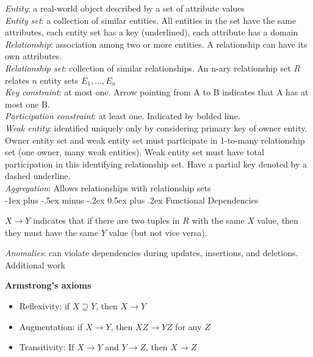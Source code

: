\documentclass[10pt,landscape]{article}
\makeatletter
\renewcommand{\section}{\@startsection{section}{1}{0mm}%
                                {-1ex plus -.5ex minus -.2ex}%
                                {0.5ex plus .2ex}%
                                {\normalfont\large\bfseries}}
\makeatother
\begin{document}
\begin{multicols}{3}
\textit{Entity}: a real-world object described by a set of attribute values \\
\textit{Entity set}: a collection of similar entities. All entities in the set have the same attributes, each entity set has a key (underlined), each attribute has a domain \\
\textit{Relationship}: association among two or more entities. A relationship can have its own attributes. \\
\textit{Relationship set}: collection of similar relationships. An n-ary relationship set $R$ relates $n$ entity sets $E_1, \ldots, E_n$ \\
\textit{Key constraint}: at most one. Arrow pointing from A to B indicates that A has at most one B. \\
\textit{Participation constraint}: at least one. Indicated by bolded line. \\
\textit{Weak entity}: identified uniquely only by considering primary key of owner entity. Owner entity set and weak entity set must participate in 1-to-many relationship set (one owner, many weak entities). Weak entity set must have total participation in this identifying relationship set. Have a partial key denoted by a dashed underline. \\
\textit{Aggregation}: Allows relationships with relationship sets \\


\section{Functional Dependencies}

$X \rightarrow Y$ indicates that if there are two tuples in $R$ with the same $X$ value, then they must have the same $Y$ value (but not vice versa).

\textit{Anomalies}: can violate dependencies during updates, insertions, and deletions. Additional work

\textbf{Armstrong's axioms}

\begin{itemize}
  \item Reflexivity: if $X \supseteq Y$, then $X \rightarrow Y$
  \item Augmentation: if $X \rightarrow Y$, then $XZ \rightarrow YZ$ for any $Z$
  \item Transitivity: If $X \rightarrow Y$ and $Y \rightarrow Z$, then $X \rightarrow Z$
\end{itemize}


\end{multicols}
\end{document}
